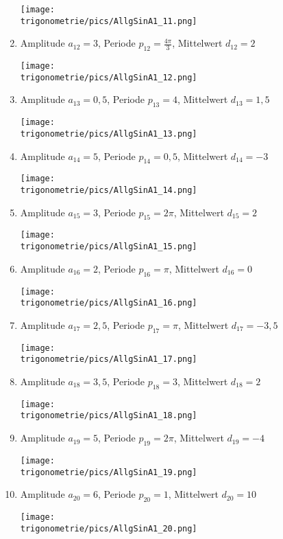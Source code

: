 \begin{Answer}[ref=allgSinCosA1]
\begin{enumerate}[label=\alph*)]
		\texttt{[image: \\trigonometrie/pics/AllgSinA1\_11.png]}
		\item Amplitude \(a_{12}=3\), Periode \(p_{12}=\frac{4\pi}{3}\), Mittelwert \(d_{12}=2\)

		\texttt{[image: \\trigonometrie/pics/AllgSinA1\_12.png]}
        \newpage
		\item Amplitude \(a_{13}=0,5\), Periode \(p_{13}=4\), Mittelwert \(d_{13}=1,5\)

		\texttt{[image: \\trigonometrie/pics/AllgSinA1\_13.png]}
		\item Amplitude \(a_{14}=5\), Periode \(p_{14}=0,5\), Mittelwert \(d_{14}=-3\)

		\texttt{[image: \\trigonometrie/pics/AllgSinA1\_14.png]}
		\item Amplitude \(a_{15}=3\), Periode \(p_{15}=2\pi\), Mittelwert \(d_{15}=2\)

		\texttt{[image: \\trigonometrie/pics/AllgSinA1\_15.png]}
		\item Amplitude \(a_{16}=2\), Periode \(p_{16}=\pi\), Mittelwert \(d_{16}=0\)

		\texttt{[image: \\trigonometrie/pics/AllgSinA1\_16.png]}
        \newpage
		\item Amplitude \(a_{17}=2,5\), Periode \(p_{17}=\pi\), Mittelwert \(d_{17}=-3,5\)

		\texttt{[image: \\trigonometrie/pics/AllgSinA1\_17.png]}
		\item Amplitude \(a_{18}=3,5\), Periode \(p_{18}=3\), Mittelwert \(d_{18}=2\)

		\texttt{[image: \\trigonometrie/pics/AllgSinA1\_18.png]}
		\item Amplitude \(a_{19}=5\), Periode \(p_{19}=2\pi\), Mittelwert \(d_{19}=-4\)

		\texttt{[image: \\trigonometrie/pics/AllgSinA1\_19.png]}
		\item Amplitude \(a_{20}=6\), Periode \(p_{20}=1\), Mittelwert \(d_{20}=10\)

		\texttt{[image: \\trigonometrie/pics/AllgSinA1\_20.png]}
	\end{enumerate}
\end{Answer}
